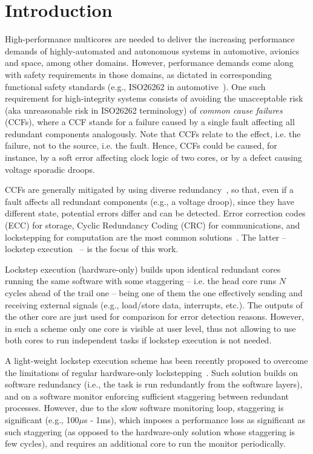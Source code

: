 \section{Introduction}

High-performance multicores are needed to deliver the increasing performance demands of highly-automated and autonomous systems in automotive, avionics and space, among other domains. However, performance demands come along with safety requirements in those domains, as dictated in corresponding functional safety standards (e.g., ISO26262 in automotive~\cite{ISO26262}).
One such requirement for high-integrity systems consists of avoiding the unacceptable risk (aka unreasonable risk in ISO26262 terminology) of \emph{common cause failures} (CCFs), where a CCF stands for a failure caused by a single fault affecting all redundant components analogously. Note that CCFs relate to the effect, i.e. the failure, not to the source, i.e. the fault. Hence, CCFs could be caused, for instance, by a soft error affecting clock logic of two cores, or by a defect causing voltage sporadic droops.

CCFs are generally mitigated by using diverse redundancy~\cite{ClassicDiversity}, so that, even if a fault affects all redundant components (e.g., a voltage droop), since they have different state, potential errors differ and can be detected. Error correction codes (ECC) for storage, Cyclic Redundancy Coding (CRC) for communications, and lockstepping for computation are the most common solutions~\cite{SergiIOLTS}. The latter -- lockstep execution~\cite{STlockstep,infineon_aurix,Iturbe2019,paper1} -- is the focus of this work. 

Lockstep execution (hardware-only) builds upon identical redundant cores running the same software with some staggering -- i.e. the head core runs $N$ cycles ahead of the trail one -- being one of them the one effectively sending and receiving external signals (e.g., load/store data, interrupts, etc.). The outputs of the other core are just used for comparison for error detection reasons. However, in such a scheme only one core is visible at user level, thus not allowing to use both cores to run independent tasks if lockstep execution is not needed.

A light-weight lockstep execution scheme has been recently proposed to overcome the limitations of regular hardware-only lockstepping~\cite{SergiDFT}. Such solution builds on software redundancy (i.e., the task is run redundantly from the software layers), and on a software monitor enforcing sufficient staggering between redundant processes. However, due to the slow software monitoring loop, staggering is significant (e.g., 100$\mu$s - 1ms), which imposes a performance loss as significant as such staggering (as opposed to the hardware-only solution whose staggering is few cycles), and requires an additional core to run the monitor periodically.

